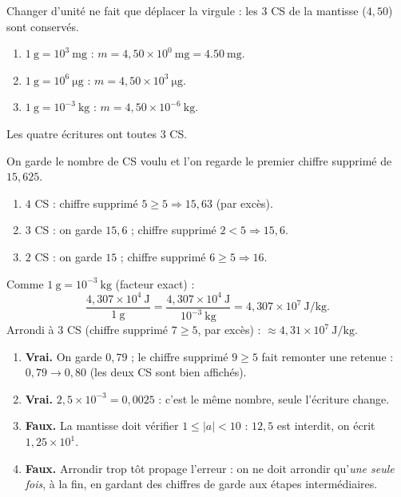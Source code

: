 \documentclass[11pt,a4paper]{article}
\begin{document}
\begin{corrige}
Changer d'unité ne fait que déplacer la virgule : les $3$ CS de la mantisse ($4,50$) sont conservés.
\begin{enumerate}[label=\alph*)]
  \item $\qty{1}{\gram}=10^{3}\ \si{\milli\gram}$ : $m = 4,50\times10^{0}\ \si{\milli\gram} = \qty{4,50}{\milli\gram}$.
  \item $\qty{1}{\gram}=10^{6}\ \si{\micro\gram}$ : $m = 4,50\times10^{3}\ \si{\micro\gram}$.
  \item $\qty{1}{\gram}=10^{-3}\ \si{\kilo\gram}$ : $m = 4,50\times10^{-6}\ \si{\kilo\gram}$.
\end{enumerate}
Les quatre écritures ont toutes $3$ CS.
\end{corrige}

\begin{corrige}
On garde le nombre de CS voulu et l'on regarde le premier chiffre supprimé de $15,625$.
\begin{enumerate}[label=\alph*)]
  \item $4$ CS : chiffre supprimé $5\ge5 \Rightarrow \boxed{15,63}$ (par excès).
  \item $3$ CS : on garde $15,6$ ; chiffre supprimé $2<5 \Rightarrow \boxed{15,6}$.
  \item $2$ CS : on garde $15$ ; chiffre supprimé $6\ge5 \Rightarrow \boxed{16}$.
\end{enumerate}
\end{corrige}

\begin{corrige}
Comme $\qty{1}{\gram}=10^{-3}\ \si{\kilo\gram}$ (facteur exact) :
\[ \frac{4,307\times10^{4}\ \si{\joule}}{\qty{1}{\gram}}
   =\frac{4,307\times10^{4}\ \si{\joule}}{10^{-3}\ \si{\kilo\gram}}
   =4,307\times10^{7}\ \si{\joule\per\kilo\gram}. \]
Arrondi à $3$ CS (chiffre supprimé $7\ge5$, par excès) :
$\boxed{\approx 4,31\times10^{7}\ \si{\joule\per\kilo\gram}}$.
\end{corrige}

\begin{corrige}
\begin{enumerate}[label=\alph*)]
  \item \textbf{Vrai.} On garde $0,79$ ; le chiffre supprimé $9\ge5$ fait remonter une retenue :
        $0,79\to 0,80$ (les deux CS sont bien affichés).
  \item \textbf{Vrai.} $2,5\times10^{-3}=0,0025$ : c'est le même nombre, seule l'écriture change.
  \item \textbf{Faux.} La mantisse doit vérifier $1\le|a|<10$ : $12,5$ est interdit, on écrit $1,25\times10^{1}$.
  \item \textbf{Faux.} Arrondir trop tôt propage l'erreur : on ne doit arrondir qu'\emph{une seule fois},
        à la fin, en gardant des chiffres de garde aux étapes intermédiaires.
\end{enumerate}
\end{corrige}
\end{document}
